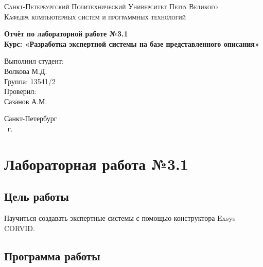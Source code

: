 \documentclass[14pt,a4paper,report]{report}
\begin{document}
\def\contentsname{Содержание}

\begin{titlepage}
	\begin{center}
		\textsc{Санкт-Петербургский Политехнический 
			Университет Петра Великого\\[5mm]
			Кафедра компьютерных систем и программных технологий}
		
		\vfill
		
		\textbf{Отчёт по лабораторной работе №3.1\\[3mm]
			Курс: «Разработка экспертной системы на базе представленного описания»\\[41mm]
		}
	\end{center}
	
	\hfill
	\begin{minipage}{.4\textwidth}
		Выполнил студент:\\[2mm] 
		Волкова М.Д.\\
		Группа: 13541/2\\[5mm]
		
		Проверил:\\[2mm] 
		Сазанов А.М.
	\end{minipage}
	\vfill
	\begin{center}
		Санкт-Петербург\\ \the\year\ г.
	\end{center}
\end{titlepage}

\tableofcontents
\clearpage

\chapter{Лабораторная работа №3.1}

\section{Цель работы}

Научиться создавать экспертные системы с помощью конструктора Exsys CORVID.

\section{Программа работы}
\end{document}
